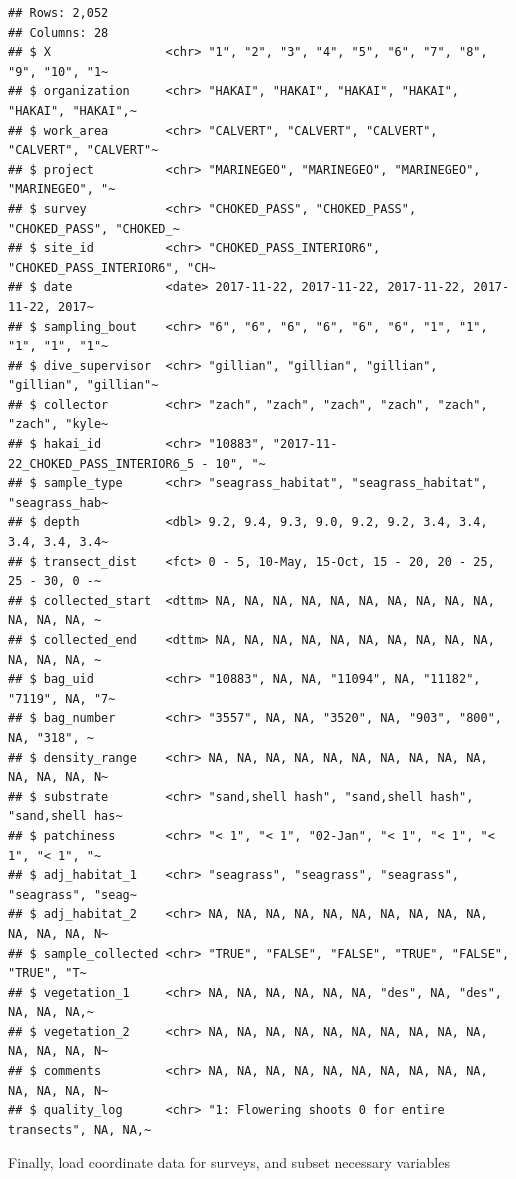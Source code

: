 \documentclass[
]{book}
\begin{document}
\begin{verbatim}
## Rows: 2,052
## Columns: 28
## $ X                <chr> "1", "2", "3", "4", "5", "6", "7", "8", "9", "10", "1~
## $ organization     <chr> "HAKAI", "HAKAI", "HAKAI", "HAKAI", "HAKAI", "HAKAI",~
## $ work_area        <chr> "CALVERT", "CALVERT", "CALVERT", "CALVERT", "CALVERT"~
## $ project          <chr> "MARINEGEO", "MARINEGEO", "MARINEGEO", "MARINEGEO", "~
## $ survey           <chr> "CHOKED_PASS", "CHOKED_PASS", "CHOKED_PASS", "CHOKED_~
## $ site_id          <chr> "CHOKED_PASS_INTERIOR6", "CHOKED_PASS_INTERIOR6", "CH~
## $ date             <date> 2017-11-22, 2017-11-22, 2017-11-22, 2017-11-22, 2017~
## $ sampling_bout    <chr> "6", "6", "6", "6", "6", "6", "1", "1", "1", "1", "1"~
## $ dive_supervisor  <chr> "gillian", "gillian", "gillian", "gillian", "gillian"~
## $ collector        <chr> "zach", "zach", "zach", "zach", "zach", "zach", "kyle~
## $ hakai_id         <chr> "10883", "2017-11-22_CHOKED_PASS_INTERIOR6_5 - 10", "~
## $ sample_type      <chr> "seagrass_habitat", "seagrass_habitat", "seagrass_hab~
## $ depth            <dbl> 9.2, 9.4, 9.3, 9.0, 9.2, 9.2, 3.4, 3.4, 3.4, 3.4, 3.4~
## $ transect_dist    <fct> 0 - 5, 10-May, 15-Oct, 15 - 20, 20 - 25, 25 - 30, 0 -~
## $ collected_start  <dttm> NA, NA, NA, NA, NA, NA, NA, NA, NA, NA, NA, NA, NA, ~
## $ collected_end    <dttm> NA, NA, NA, NA, NA, NA, NA, NA, NA, NA, NA, NA, NA, ~
## $ bag_uid          <chr> "10883", NA, NA, "11094", NA, "11182", "7119", NA, "7~
## $ bag_number       <chr> "3557", NA, NA, "3520", NA, "903", "800", NA, "318", ~
## $ density_range    <chr> NA, NA, NA, NA, NA, NA, NA, NA, NA, NA, NA, NA, NA, N~
## $ substrate        <chr> "sand,shell hash", "sand,shell hash", "sand,shell has~
## $ patchiness       <chr> "< 1", "< 1", "02-Jan", "< 1", "< 1", "< 1", "< 1", "~
## $ adj_habitat_1    <chr> "seagrass", "seagrass", "seagrass", "seagrass", "seag~
## $ adj_habitat_2    <chr> NA, NA, NA, NA, NA, NA, NA, NA, NA, NA, NA, NA, NA, N~
## $ sample_collected <chr> "TRUE", "FALSE", "FALSE", "TRUE", "FALSE", "TRUE", "T~
## $ vegetation_1     <chr> NA, NA, NA, NA, NA, NA, "des", NA, "des", NA, NA, NA,~
## $ vegetation_2     <chr> NA, NA, NA, NA, NA, NA, NA, NA, NA, NA, NA, NA, NA, N~
## $ comments         <chr> NA, NA, NA, NA, NA, NA, NA, NA, NA, NA, NA, NA, NA, N~
## $ quality_log      <chr> "1: Flowering shoots 0 for entire transects", NA, NA,~
\end{verbatim}

Finally, load coordinate data for surveys, and subset necessary variables
\end{document}

